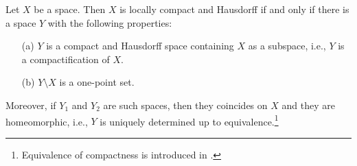 \begin{thm}
    Let $X$ be a space.
    Then $X$ is locally compact and Hausdorff if and only if there is a space $Y$ with the following properties:
    \begin{enumerate}
        \item[(a)]
        {
            $Y$ is a compact and Hausdorff space containing $X$ as a subspace, i.e., $Y$ is a compactification of $X$.
        }
        \item[(b)]
        {
            $Y\setminus X$ is a one-point set.
        }
    \end{enumerate}
    Moreover, if $Y_1$ and $Y_2$ are such spaces, then they coincides on $X$ and they are homeomorphic, i.e., $Y$ is uniquely determined up to equivalence.\footnote{Equivalence of compactness is introduced in .}
\end{thm}
